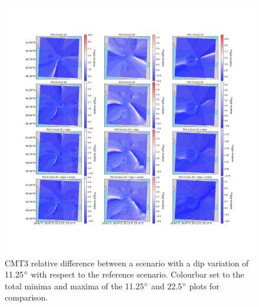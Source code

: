 \documentclass[../Text/00main.tex]{subfiles}
\begin{document}
\begin{figure}[!h]
    \centering
    \includegraphics[width=1\linewidth,trim = 2cm 5cm 1cm 5cm, clip]{images_results/dip_variation_epsilon12_sc2.png}
    \caption{CMT3 relative difference between a scenario with a dip variation of 11.25$\degree$ with respect to the reference scenario. Colourbar set to the total minima and maxima of the 11.25$\degree$ and 22.5$\degree$ plots for comparison.}
    \label{fig:ref_eps12-2}
\end{figure}
\end{document}

